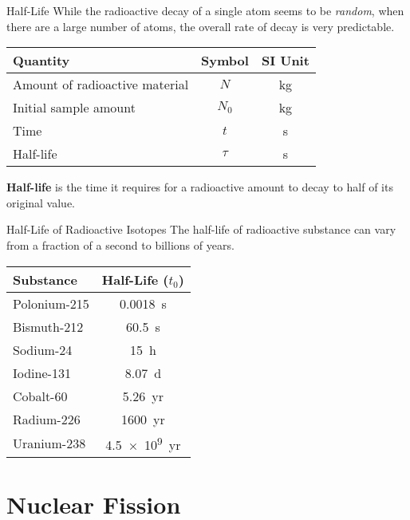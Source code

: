 \documentclass[12pt,compress,aspectratio=169]{beamer}
\newcommand{\eq}[2]{
  \vspace{#1}{\Large\begin{displaymath}#2\end{displaymath}}
}
\begin{document}
\begin{frame}{Half-Life}
  While the radioactive decay of a single atom seems to be \emph{random}, when
  there are a large number of atoms, the overall rate of decay is very
  predictable.
  
  \eq{-.2in}{
    \boxed{N=N_0\left(\frac12\right)^{\frac{t}\tau}}
  }
  \begin{center}
    \begin{tabular}{l|c|c}
      \rowcolor{pink}
      \textbf{Quantity}      & \textbf{Symbol} & \textbf{SI Unit} \\ \hline
      Amount of radioactive material & $N$  & \si{\kilogram}\\
      Initial sample amount          & $N_0$ & \si{\kilo\gram}\\
      Time                           & $t$  & \si{\second} \\
      Half-life                      & $\tau$ & \si{\second}
    \end{tabular}
  \end{center}
  \textbf{Half-life} is the time it requires for a radioactive amount to decay
  to half of its original value.
\end{frame}



\begin{frame}{Half-Life of Radioactive Isotopes}
  The half-life of radioactive substance can vary from a fraction of
  a second to billions of years.
  \begin{center}
    \begin{tabular}{l|c}
      \rowcolor{pink}
      \textbf{Substance} & \textbf{Half-Life} ($t_0$) \\ \hline
      Polonium-215 & \SI{.0018}{\second} \\
      Bismuth-212  & \SI{60.5}{\second} \\
      Sodium-24    & \SI{15}{\hour} \\
      Iodine-131   & \SI{8.07}{\day} \\
      Cobalt-60    & \SI{5.26}{yr} \\ 
      Radium-226   & \SI{1600}{yr} \\
      Uranium-238  & \SI{4.5e9}{yr}
    \end{tabular}
  \end{center}
\end{frame}



\section{Nuclear Fission}
\end{document}
